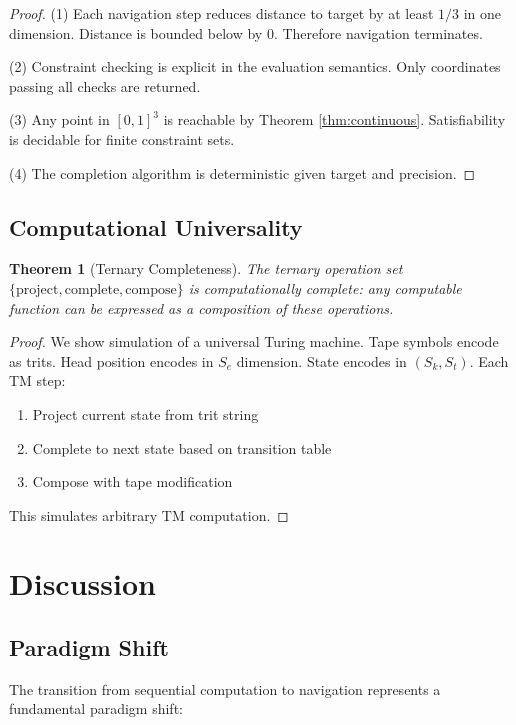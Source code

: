 \documentclass[twocolumn,10pt]{article}
\newtheorem{theorem}{Theorem}[section]
\theoremstyle{remark}
\newcommand{\Sk}{S_k}
\newcommand{\St}{S_t}
\newcommand{\Se}{S_e}
\begin{document}
\begin{proof}
(1) Each navigation step reduces distance to target by at least $1/3$ in one dimension. Distance is bounded below by 0. Therefore navigation terminates.

(2) Constraint checking is explicit in the evaluation semantics. Only coordinates passing all checks are returned.

(3) Any point in $[0,1]^3$ is reachable by Theorem \ref{thm:continuous}. Satisfiability is decidable for finite constraint sets.

(4) The completion algorithm is deterministic given target and precision.
\end{proof}

\subsection{Computational Universality}

\begin{theorem}[Ternary Completeness]
The ternary operation set $\{\text{project}, \text{complete}, \text{compose}\}$ is computationally complete: any computable function can be expressed as a composition of these operations.
\end{theorem}

\begin{proof}
We show simulation of a universal Turing machine. Tape symbols encode as trits. Head position encodes in $\Se$ dimension. State encodes in $(\Sk, \St)$. Each TM step:
\begin{enumerate}
\item Project current state from trit string
\item Complete to next state based on transition table
\item Compose with tape modification
\end{enumerate}
This simulates arbitrary TM computation.
\end{proof}

\section{Discussion}

\subsection{Paradigm Shift}

The transition from sequential computation to navigation represents a fundamental paradigm shift:
\end{document}
